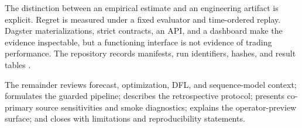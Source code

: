 The distinction between an empirical estimate and an engineering artifact is explicit. Regret is measured under a fixed evaluator and time-ordered replay. Dagster materializations, strict contracts, an API, and a dashboard make the evidence inspectable, but a functioning interface is not evidence of trading performance. The repository records manifests, run identifiers, hashes, and result tables \cite{fefelov2026repo}.

The remainder reviews forecast, optimization, DFL, and sequence-model context; formulates the guarded pipeline; describes the retrospective protocol; presents co-primary source sensitivities and smoke diagnostics; explains the operator-preview surface; and closes with limitations and reproducibility statements.
